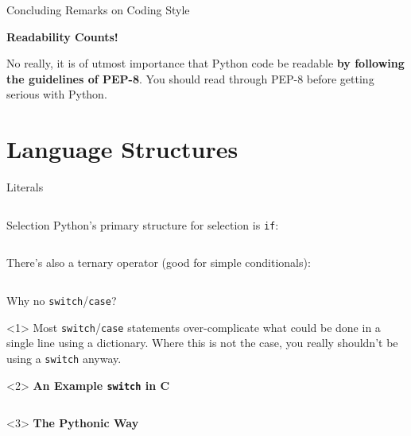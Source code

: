\documentclass{lug}
\begin{document}
\begin{frame}{Concluding Remarks on Coding Style}
    \begin{center}
        \bfseries
        \Huge
        Readability Counts!
    \end{center}

    \begin{center}
        No really, it is of utmost importance that Python code be readable
        \textbf{by following the guidelines of PEP-8}. You should read through
        PEP-8 before getting serious with Python.
    \end{center}
\end{frame}

\section{Language Structures}

\begin{frame}{Literals}
    \inputminted{python3}{examples/literals.py}
\end{frame}

\begin{frame}{Selection}
    Python's primary structure for selection is \texttt{if}:

    \inputminted{python3}{examples/ifexample.py}

    \pause

    There's also a ternary operator (good for simple conditionals):

    \inputminted{python3}{examples/ternary.py}

\end{frame}

\begin{frame}{Why no \texttt{switch}/\texttt{case}?}

    \begin{onlyenv}<1>
        Most \texttt{switch}/\texttt{case} statements over-complicate what could be
        done in a single line using a dictionary. Where this is not the case, you
        really shouldn't be using a \texttt{switch} anyway.
    \end{onlyenv}

    \begin{onlyenv}<2>
        \textbf{\large An Example \texttt{switch} in C}\par
        \inputminted{c}{examples/switch.c}
    \end{onlyenv}

    \begin{onlyenv}<3>
        \textbf{\large The Pythonic Way}\par
        \inputminted{python3}{examples/dictswitch.py}
    \end{onlyenv}

\end{frame}
\end{document}
